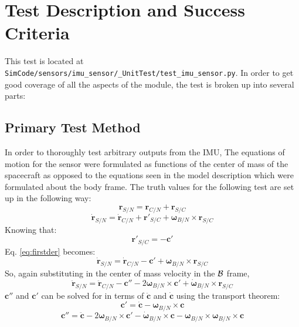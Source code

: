 \section{Test Description and Success Criteria}
This test is located at {\tt SimCode/sensors/imu\_sensor/\_UnitTest/test\_imu\_sensor.py}. In order to get good coverage of all the aspects of the module, the test is broken up into several parts: \par

\subsection{Primary Test Method}
In order to thoroughly test arbitrary outputs from the IMU, The equations of motion for the sensor were formulated as functions of the center of mass of the spacecraft as opposed to the equations seen in the model description which were formulated about the body frame. The truth values for the following test are set up in the following way:
\begin{equation}
{\bm{r}}_{S/N} = {\bm{r}}_{C/N} + {\bm{r}}_{S/C}
\end{equation}
\begin{equation}
\dot{{\bm{r}}}_{S/N} = \dot{{\bm{r}}}_{C/N} + {\bm{r}}'_{S/C} + \bm{\omega}_{B/N} \times {\bm{r}}_{S/C}
\label{eq:firstder}
\end{equation}
Knowing that:
\begin{equation}
{\bm{r}}'_{S/C} = - \bm{c}'
\end{equation}
Eq. \ref{eq:firstder} becomes:
\begin{equation}
	\dot{{\bm{r}}}_{S/N} = \dot{{\bm{r}}}_{C/N} - \bm{c}' + \bm{\omega}_{B/N} \times {\bm{r}}_{S/C}
\end{equation}
So, again substituting in the center of mass velocity in the $\cal{B}$ frame,
\begin{equation}
\ddot{{\bm{r}}}_{S/N} = \ddot{{\bm{r}}}_{C/N} - \bm{c}'' - 2\bm{\omega}_{B/N} \times \bm{c}'  + \dot{\bm{\omega}}_{B/N} \times {\bm{r}}_{S/C}
\label{eq:SN}
\end{equation}
$ \bm{c}''$ and $ \bm{c}'$ can be solved for in terms of $\ddot{\bm{c}}$ and $\dot{\bm{c}}$ using the transport theorem:
\begin{equation}
\bm{c}'   = \dot{\bm{c}} - \bm{\omega}_{B/N} \times \bm{c}
\end{equation}
\begin{equation}
\bm{c}''  = \ddot{\bm{c}}  - 2\bm{\omega}_{B/N} \times \bm{c}' - \dot{\bm{\omega}}_{B/N} \times \bm{c}  -\bm{\omega}_{B/N} \times \bm{\omega}_{B/N} \times \bm{c}
\end{equation}
